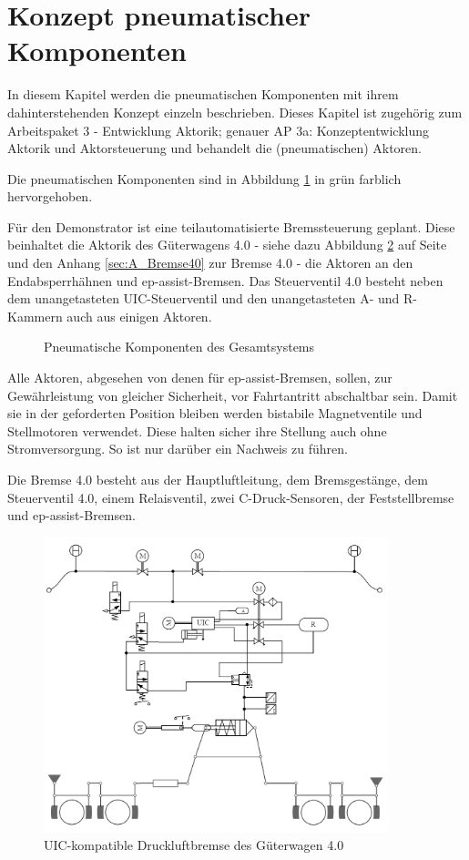 \section{Konzept pneumatischer Komponenten} \label{sec:pKomp}
In diesem Kapitel werden die pneumatischen Komponenten mit ihrem dahinterstehenden Konzept einzeln beschrieben. Dieses Kapitel ist zugehörig zum Arbeitspaket 3 - Entwicklung Aktorik; genauer AP 3a: Konzeptentwicklung Aktorik und Aktorsteuerung und behandelt die (pneumatischen) Aktoren.\par
Die pneumatischen Komponenten sind in Abbildung \ref{fig:pKomp} in grün farblich hervorgehoben.\par
Für den \gls{Demonstrator} ist eine teilautomatisierte Bremssteuerung geplant. Diese beinhaltet die Aktorik des Güterwagens 4.0 - siehe dazu Abbildung \ref{fig:UIC-Bremse} auf Seite \pageref{fig:UIC-Bremse} und den Anhang \ref{sec:A_Bremse40} zur \gls{Bremse 4.0} - die Aktoren an den Endabsperrhähnen und \gls{ep-assist-Bremsen}. Das Steuerventil 4.0 besteht neben dem unangetasteten UIC-Steuerventil und den unangetasteten A- und R-Kammern auch aus einigen Aktoren.\par
\begin{figure}[hbt]
    \centering
    
    \caption{Pneumatische Komponenten des Gesamtsystems}
    \label{fig:pKomp}
\end{figure}
Alle Aktoren, abgesehen von denen für \gls{ep-assist-Bremsen}, sollen, zur Gewährleistung von gleicher Sicherheit, vor Fahrtantritt abschaltbar sein. Damit sie in der geforderten Position bleiben werden bistabile Magnetventile und Stellmotoren verwendet. Diese halten sicher ihre Stellung auch ohne Stromversorgung. So ist nur darüber ein Nachweis zu führen.\par
Die \gls{Bremse 4.0} besteht aus der Hauptluftleitung, dem Bremsgestänge, dem Steuerventil 4.0, einem Relaisventil, zwei C-Druck-Sensoren, der Feststellbremse und \gls{ep-assist-Bremsen}.\par
\begin{figure}
    \centering%
    \includegraphics[width=10cm]{Bilder/GW40Schema.PNG}
    \caption{UIC-kompatible Druckluftbremse des Güterwagen 4.0}%
    \label{fig:UIC-Bremse}
\end{figure}
